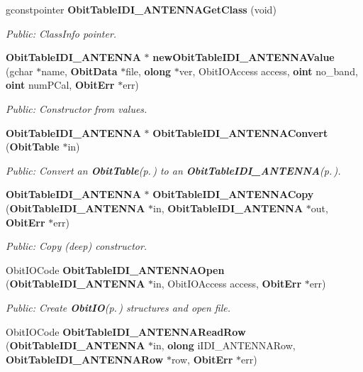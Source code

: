 \begin{CompactItemize}
gconstpointer {\bf Obit\-Table\-IDI\_\-ANTENNAGet\-Class} (void)
\begin{CompactList}\small\item\em Public: Class\-Info pointer. \item\end{CompactList}\item 
{\bf Obit\-Table\-IDI\_\-ANTENNA} $\ast$ {\bf new\-Obit\-Table\-IDI\_\-ANTENNAValue} (gchar $\ast$name, {\bf Obit\-Data} $\ast$file, {\bf olong} $\ast$ver, Obit\-IOAccess access, {\bf oint} no\_\-band, {\bf oint} num\-PCal, {\bf Obit\-Err} $\ast$err)
\begin{CompactList}\small\item\em Public: Constructor from values. \item\end{CompactList}\item 
{\bf Obit\-Table\-IDI\_\-ANTENNA} $\ast$ {\bf Obit\-Table\-IDI\_\-ANTENNAConvert} ({\bf Obit\-Table} $\ast$in)
\begin{CompactList}\small\item\em Public: Convert an {\bf Obit\-Table}{\rm (p.\,\pageref{structObitTable})} to an {\bf Obit\-Table\-IDI\_\-ANTENNA}{\rm (p.\,\pageref{structObitTableIDI__ANTENNA})}. \item\end{CompactList}\item 
{\bf Obit\-Table\-IDI\_\-ANTENNA} $\ast$ {\bf Obit\-Table\-IDI\_\-ANTENNACopy} ({\bf Obit\-Table\-IDI\_\-ANTENNA} $\ast$in, {\bf Obit\-Table\-IDI\_\-ANTENNA} $\ast$out, {\bf Obit\-Err} $\ast$err)
\begin{CompactList}\small\item\em Public: Copy (deep) constructor. \item\end{CompactList}\item 
Obit\-IOCode {\bf Obit\-Table\-IDI\_\-ANTENNAOpen} ({\bf Obit\-Table\-IDI\_\-ANTENNA} $\ast$in, Obit\-IOAccess access, {\bf Obit\-Err} $\ast$err)
\begin{CompactList}\small\item\em Public: Create {\bf Obit\-IO}{\rm (p.\,\pageref{structObitIO})} structures and open file. \item\end{CompactList}\item 
Obit\-IOCode {\bf Obit\-Table\-IDI\_\-ANTENNARead\-Row} ({\bf Obit\-Table\-IDI\_\-ANTENNA} $\ast$in, {\bf olong} i\-IDI\_\-ANTENNARow, {\bf Obit\-Table\-IDI\_\-ANTENNARow} $\ast$row, {\bf Obit\-Err} $\ast$err)

\end{CompactItemize}
